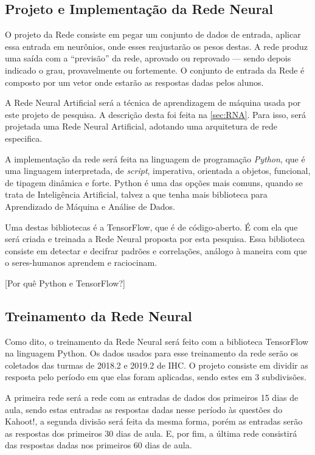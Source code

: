 \subsection{Projeto e Implementação da Rede Neural}

O projeto da Rede consiste em pegar um conjunto de dados de entrada, aplicar essa entrada em neurônios, onde esses reajustarão os pesos destas. A rede produz uma saída com a ``previsão'' da rede, aprovado ou reprovado --- sendo depois indicado o grau, provavelmente ou fortemente. O conjunto de entrada da Rede é composto por um vetor onde estarão as respostas dadas pelos alunos.

A Rede Neural Artificial será a técnica de aprendizagem de máquina usada por este projeto de pesquisa. A descrição desta foi feita na \autoref{sec:RNA}. Para isso, será projetada uma Rede Neural Artificial, adotando uma arquitetura de rede especifica.

A implementação da rede será feita na linguagem de programação \textit{Python}, que é uma linguagem interpretada, de \textit{script}, imperativa, orientada a objetos, funcional, de tipagem dinâmica e forte. Python é uma das opções mais comuns, quando se trata de Inteligência Artificial, talvez a que tenha mais biblioteca para Aprendizado de Máquina e Análise de Dados.

Uma destas bibliotecas é a TensorFlow, que é de código-aberto. É com ela que será criada e treinada a Rede Neural proposta por esta pesquisa. Essa biblioteca consiste em detectar e decifrar padrões e correlações, análogo à maneira com que o seres-humanos aprendem e raciocinam. 

{\color{red} [Por quê Python e TensorFlow?]}

\subsection{Treinamento da Rede Neural}

Como dito, o treinamento da Rede Neural será feito com a biblioteca TensorFlow na linguagem Python. Os dados usados para esse treinamento da rede serão os coletados das turmas de 2018.2 e 2019.2 de IHC. O projeto consiste em dividir as resposta pelo período em que elas foram aplicadas, sendo estes em 3 subdivisões.

A primeira rede será a rede com as entradas de dados dos primeiros 15 dias de aula, sendo estas entradas as respostas dadas nesse período às questões do Kahoot!, a segunda divisão será feita da mesma forma, porém as entradas serão as respostas dos primeiros 30 dias de aula. E, por fim, a última rede consistirá das respostas dadas nos primeiros 60 dias de aula.

